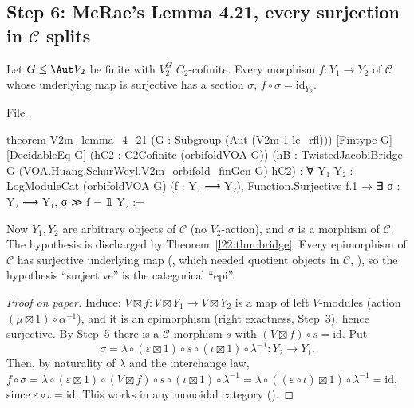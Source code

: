 \subsection{Step 6: McRae's Lemma 4.21, every surjection in \texorpdfstring{$\mathcal C$}{C} splits}

\begin{theorem}\label{l22:thm:O6}
Let $G\le\Aut V_2$ be finite with $V_2^G$ $C_2$-cofinite. Every morphism $f:Y_1\to Y_2$ of $\mathcal C$ whose underlying
map is surjective has a section $\sigma$, $f\circ\sigma=\mathrm{id}_{Y_2}$.
\end{theorem}
\noindent File .
\begin{leancode}
theorem V2m_lemma_4_21 (G : Subgroup (Aut (V2m 1 le_rfl))) [Fintype G] [DecidableEq G]
    (hC2 : C2Cofinite (orbifoldVOA G))
    (hB : TwistedJacobiBridge G (VOA.Huang.SchurWeyl.V2m_orbifold_finGen G) hC2) :
    ∀ {Y₁ Y₂ : LogModuleCat (orbifoldVOA G)} (f : Y₁ ⟶ Y₂), Function.Surjective f.1 →
      ∃ σ : Y₂ ⟶ Y₁, σ ≫ f = 𝟙 Y₂ :=
\end{leancode}

\begin{dictionary}
Now $Y_1,Y_2$ are arbitrary objects of $\mathcal C$ (no $V_2$-action), and $\sigma$ is a morphism of $\mathcal C$. The
hypothesis  is discharged by Theorem~\ref{l22:thm:bridge}. Every epimorphism of $\mathcal C$ has surjective
underlying map (, which needed quotient objects in $\mathcal C$, ),
so the hypothesis ``surjective'' is the categorical ``epi''.
\end{dictionary}

\begin{proof}[Proof on paper]
Induce: $V\boxtimes f:V\boxtimes Y_1\to V\boxtimes Y_2$ is a map of left $V$-modules (action
$(\mu\boxtimes1)\circ\alpha^{-1}$), and it is an epimorphism (right exactness, Step~3), hence surjective. By Step~5 there is a
$\mathcal C$-morphism $s$ with $(V\boxtimes f)\circ s=\mathrm{id}$. Put
\begin{equation*}
  \sigma=\lambda\circ(\varepsilon\boxtimes1)\circ s\circ(\iota\boxtimes1)\circ\lambda^{-1}:Y_2\to Y_1 .
\end{equation*}
Then, by naturality of $\lambda$ and the interchange law,
$f\circ\sigma=\lambda\circ(\varepsilon\boxtimes1)\circ(V\boxtimes f)\circ s\circ(\iota\boxtimes1)\circ\lambda^{-1}
=\lambda\circ((\varepsilon\circ\iota)\boxtimes1)\circ\lambda^{-1}=\mathrm{id}$, since $\varepsilon\circ\iota=\mathrm{id}$.
This works in any monoidal category ().
\end{proof}

